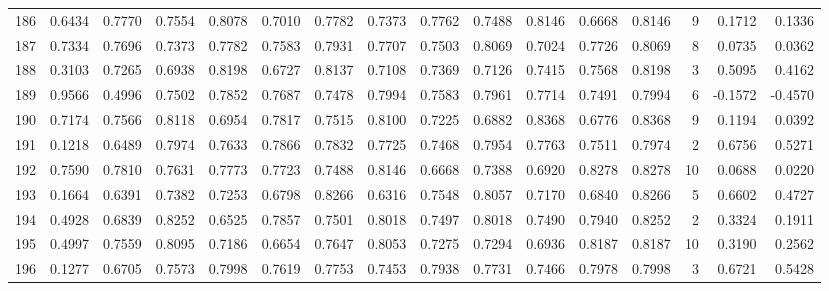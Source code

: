 \begin{tabular}{lrrrrrrrrrrrrrrr}
186 &      0.6434 &  0.7770 &  0.7554 &  0.8078 &  0.7010 &  0.7782 &  0.7373 &  0.7762 &  0.7488 &  0.8146 &   0.6668 &     0.8146 &      9 &                    0.1712 &                     0.1336 \\
187 &      0.7334 &  0.7696 &  0.7373 &  0.7782 &  0.7583 &  0.7931 &  0.7707 &  0.7503 &  0.8069 &  0.7024 &   0.7726 &     0.8069 &      8 &                    0.0735 &                     0.0362 \\
188 &      0.3103 &  0.7265 &  0.6938 &  0.8198 &  0.6727 &  0.8137 &  0.7108 &  0.7369 &  0.7126 &  0.7415 &   0.7568 &     0.8198 &      3 &                    0.5095 &                     0.4162 \\
189 &      0.9566 &  0.4996 &  0.7502 &  0.7852 &  0.7687 &  0.7478 &  0.7994 &  0.7583 &  0.7961 &  0.7714 &   0.7491 &     0.7994 &      6 &                   -0.1572 &                    -0.4570 \\
190 &      0.7174 &  0.7566 &  0.8118 &  0.6954 &  0.7817 &  0.7515 &  0.8100 &  0.7225 &  0.6882 &  0.8368 &   0.6776 &     0.8368 &      9 &                    0.1194 &                     0.0392 \\
191 &      0.1218 &  0.6489 &  0.7974 &  0.7633 &  0.7866 &  0.7832 &  0.7725 &  0.7468 &  0.7954 &  0.7763 &   0.7511 &     0.7974 &      2 &                    0.6756 &                     0.5271 \\
192 &      0.7590 &  0.7810 &  0.7631 &  0.7773 &  0.7723 &  0.7488 &  0.8146 &  0.6668 &  0.7388 &  0.6920 &   0.8278 &     0.8278 &     10 &                    0.0688 &                     0.0220 \\
193 &      0.1664 &  0.6391 &  0.7382 &  0.7253 &  0.6798 &  0.8266 &  0.6316 &  0.7548 &  0.8057 &  0.7170 &   0.6840 &     0.8266 &      5 &                    0.6602 &                     0.4727 \\
194 &      0.4928 &  0.6839 &  0.8252 &  0.6525 &  0.7857 &  0.7501 &  0.8018 &  0.7497 &  0.8018 &  0.7490 &   0.7940 &     0.8252 &      2 &                    0.3324 &                     0.1911 \\
195 &      0.4997 &  0.7559 &  0.8095 &  0.7186 &  0.6654 &  0.7647 &  0.8053 &  0.7275 &  0.7294 &  0.6936 &   0.8187 &     0.8187 &     10 &                    0.3190 &                     0.2562 \\
196 &      0.1277 &  0.6705 &  0.7573 &  0.7998 &  0.7619 &  0.7753 &  0.7453 &  0.7938 &  0.7731 &  0.7466 &   0.7978 &     0.7998 &      3 &                    0.6721 &                     0.5428 \\

\end{tabular}
